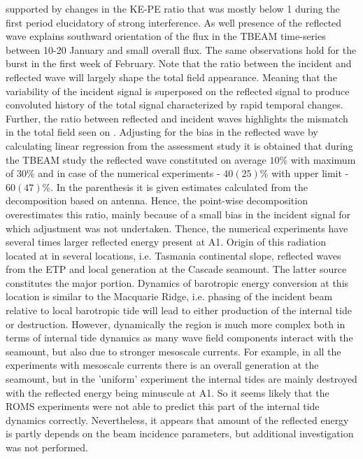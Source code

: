 \documentclass[12pt]{article}
\begin{document}
supported by changes in the KE-PE ratio that was mostly below 1 during the first period 
elucidatory of strong interference. As well presence of the reflected wave explains southward 
orientation of the flux in the TBEAM time-series between 10-20 January and small overall flux. The 
same observations hold for the burst in the first week of February. Note that the ratio 
between the incident and reflected wave will largely shape the total field appearance. Meaning that 
the variability of the incident signal is superposed on the reflected signal to produce convoluted 
history of the total signal characterized by rapid temporal changes. Further, the ratio between 
reflected and incident waves highlights the mismatch in the total field seen on 
. Adjusting for the bias in the reflected wave by calculating linear 
regression from the assessment study  it is obtained that during 
the TBEAM study the reflected wave constituted on average $10\%$ with maximum of $30\%$ and in case 
of the numerical experiments - $40(25)\%$ with upper limit - $60(47)\%$. In the parenthesis it is 
given estimates calculated from the decomposition based on antenna. Hence, the point-wise 
decomposition overestimates this ratio, mainly because of a small bias in the incident signal for 
which adjustment was not undertaken. Thence, the numerical experiments have several times larger 
reflected energy present at A1. Origin of this radiation located at in several locations, i.e. 
Tasmania continental slope, reflected waves from the ETP and local generation at the 
Cascade seamount. The latter source constitutes the major portion. Dynamics of barotropic energy 
conversion at this location is similar to the Macquarie Ridge, i.e. phasing of the incident beam 
relative to local barotropic tide will lead to either production of the internal tide or 
destruction. However, dynamically the region is much more complex both in terms of internal tide 
dynamics as many wave field components interact with the seamount, but also due to stronger 
mesoscale currents. For example, in all the experiments with mesoscale currents there is an overall 
generation at the seamount, but in the 'uniform' experiment the internal tides are mainly 
destroyed with the reflected energy being minuscule at A1. So it seems likely that the ROMS 
experiments were not able to predict this part of the internal tide dynamics correctly. 
Nevertheless, it appears that amount of the reflected energy is partly depends on the beam 
incidence parameters, but additional investigation was not performed.\\
\end{document}
